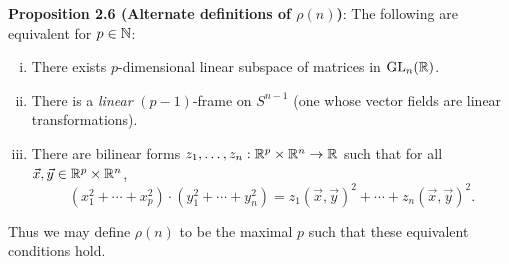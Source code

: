 \documentclass{amsart}
\begin{document}
\noindent \textbf{Proposition 2.6 (Alternate definitions of $\rho(n)$)}: The following are equivalent for $p\in \mathbb{N}$:
\begin{enumerate}[(i)]
	\item There exists $p$-dimensional linear subspace of matrices in $\operatorname{GL}_n(\mathbb{R})$.
	\item There is a \textit{linear} $(p-1)$-frame on $S^{n-1}$ (one whose vector fields are linear transformations).
	\item There are bilinear forms $z_1,\dots,z_n:\mathbb{R}^p\times \mathbb{R}^n \to \mathbb{R}$ such that for all $\vec{x},\vec{y}\in \mathbb{R}^p\times \mathbb{R}^n$,
	$$
	(x_1^2+\cdots + x_p^2) \cdot (y_1^2+\cdots +y_n^2) = z_1(\vec{x},\vec{y})^2 + \cdots + z_n(\vec{x},\vec{y})^2.
	$$
\end{enumerate}
Thus we may define $\rho(n)$ to be the maximal $p$ such that these equivalent conditions hold.
\end{document}
